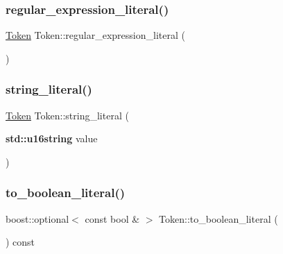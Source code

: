\mbox{\label{class_token_a70cc5b1f483d5f8f58290e70867d542e}} 
\subsubsection{\texorpdfstring{regular\+\_\+expression\+\_\+literal()}{regular\_expression\_literal()}}
{\footnotesize\ttfamily \hyperlink{class_token}{Token} Token\+::regular\+\_\+expression\+\_\+literal (\begin{DoxyParamCaption}{ }\end{DoxyParamCaption})\hspace{0.3cm}{\ttfamily [static]}}

\mbox{\label{class_token_a51926fd7d348479bf923c6fce7650f35}} 
\subsubsection{\texorpdfstring{string\+\_\+literal()}{string\_literal()}}
{\footnotesize\ttfamily \hyperlink{class_token}{Token} Token\+::string\+\_\+literal (\begin{DoxyParamCaption}\item[{\textbf{ std\+::u16string}}]{value }\end{DoxyParamCaption})\hspace{0.3cm}{\ttfamily [static]}}

\mbox{\label{class_token_a1be97c731f423827dd4725de8eb2a41f}} 
\subsubsection{\texorpdfstring{to\+\_\+boolean\+\_\+literal()}{to\_boolean\_literal()}}
{\footnotesize\ttfamily boost\+::optional$<$ const bool \& $>$ Token\+::to\+\_\+boolean\+\_\+literal (\begin{DoxyParamCaption}{ }\end{DoxyParamCaption}) const}


